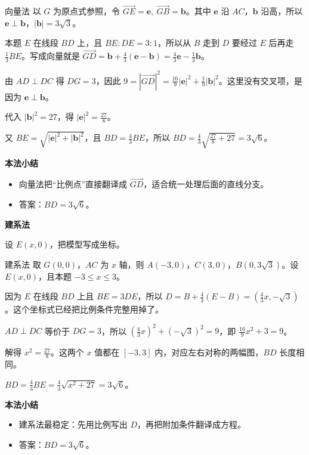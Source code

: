\documentclass{exam-zh}
\newenvironment{eduSubQuestionItem}[1]{%
  \needspace{4\baselineskip}%
  \vspace{2mm}
  \par\noindent
  \hangindent=8mm\hangafter=1
  {\color{edu-blue}\bfseries #1}\enspace
  \begingroup
  \color{edu-ink}
}{%
  \endgroup
  \par
  \vspace{3mm}
}
\newenvironment{eduBulletList}{%
  \begin{itemize}[
    label=\textbullet,
    leftmargin=5mm,
    itemsep=1.2mm,
    topsep=0pt,
    parsep=0pt
  ]
}{%
  \end{itemize}
}
\begin{document}
\begin{eduSolutionBox}{向量法}
  \begingroup
  \setlength{\parskip}{2.5mm}
以 $G$ 为原点式参照，令 $\vec{GE}=\mathbf e,\ \vec{GB}=\mathbf b$。其中 $\mathbf e$ 沿 $AC$，$\mathbf b$ 沿高，所以 $\mathbf e\perp\mathbf b$，$|\mathbf b|=3\sqrt3$。\par
本题 $E$ 在线段 $BD$ 上，且 $BE:DE=3:1$，所以从 $B$ 走到 $D$ 要经过 $E$ 后再走 $\frac13BE$。写成向量就是 $\vec{GD}=\mathbf b+\frac43(\mathbf e-\mathbf b)=\frac43\mathbf e-\frac13\mathbf b$。\par
由 $AD\perp DC$ 得 $DG=3$，因此 $9=|\vec{GD}|^2=\frac{16}{9}|\mathbf e|^2+\frac19|\mathbf b|^2$。这里没有交叉项，是因为 $\mathbf e\perp\mathbf b$。\par
代入 $|\mathbf b|^2=27$，得 $|\mathbf e|^2=\frac{27}{8}$。\par
又 $BE=\sqrt{|\mathbf e|^2+|\mathbf b|^2}$，且 $BD=\frac43BE$，所以 $BD=\frac43\sqrt{\frac{27}{8}+27}=3\sqrt6$。\par
  \endgroup
  \vspace{2.5mm}
  {\color{edu-blue}\bfseries\small 本法小结}\par\vspace{1.5mm}
  \begin{eduBulletList}
    \item 向量法把“比例点”直接翻译成 $\vec{GD}$，适合统一处理后面的直线分支。    \item 答案：$BD=3\sqrt6$。  \end{eduBulletList}
\end{eduSolutionBox}




\begin{eduSubQuestionItem}{建系法}
设 $E(x,0)$，把模型写成坐标。\end{eduSubQuestionItem}

\begin{eduSolutionBox}{建系法}
  \begingroup
  \setlength{\parskip}{2.5mm}
取 $G(0,0)$，$AC$ 为 $x$ 轴，则 $A(-3,0)$，$C(3,0)$，$B(0,3\sqrt3)$。设 $E(x,0)$，且本题 $-3\le x\le 3$。\par
因为 $E$ 在线段 $BD$ 上且 $BE=3DE$，所以 $D=B+\frac43(E-B)=(\frac43x,-\sqrt3)$。这个坐标式已经把比例条件完整用掉了。\par
$AD\perp DC$ 等价于 $DG=3$，所以 $(\frac43x)^2+(-\sqrt3)^2=9$，即 $\frac{16}{9}x^2+3=9$。\par
解得 $x^2=\frac{27}{8}$。这两个 $x$ 值都在 $[-3,3]$ 内，对应左右对称的两幅图，$BD$ 长度相同。\par
$BD=\frac43BE=\frac43\sqrt{x^2+27}=3\sqrt6$。\par
  \endgroup
  \vspace{2.5mm}
  {\color{edu-blue}\bfseries\small 本法小结}\par\vspace{1.5mm}
  \begin{eduBulletList}
    \item 建系法最稳定：先用比例写出 $D$，再把附加条件翻译成方程。    \item 答案：$BD=3\sqrt6$。  \end{eduBulletList}
\end{eduSolutionBox}
\end{document}
